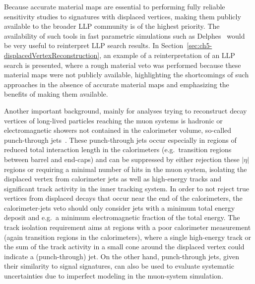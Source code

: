 Because accurate material maps are essential to performing fully reliable sensitivity studies to signatures with displaced vertices, making them publicly available to the broader LLP community is of the highest priority. The availability of such tools in fast parametric simulations such as Delphes~\cite{deFavereau:2013fsa} would be very useful to reinterpret LLP search results. In Section~\ref{sec:ch5-displacedVertexReconstruction}, an example of a reinterpretation of an LLP search is presented, where a rough material veto was performed because these material maps were not publicly available, highlighting the shortcomings of such approaches in the absence of accurate material maps and emphasizing the benefits of making them available.


Another important background, mainly for analyses trying to reconstruct decay vertices of long-lived particles reaching the muon systems is hadronic or electromagnetic showers not contained in the calorimeter volume, so-called punch-through jets~\cite{}. These punch-through jets occur especially in regions of reduced total interaction length in the calorimeters (e.g.\ transition regions between barrel and end-caps) and can be suppressed by either rejection these $|\eta|$ regions or requiring a minimal number of hits in the muon system, isolating the displaced vertex from calorimeter jets as well as high-energy tracks and significant track activity in the inner tracking system. In order to not reject true vertices from displaced decays that occur near the end of the calorimeters, the calorimeter-jets veto should only consider jets with a minimum total energy deposit and e.g.\ a minimum electromagnetic fraction of the total energy. The track isolation requirement aims at regions with a poor calorimeter measurement (again transition regions in the calorimeters), where a single high-energy track or the sum of the track activity in a small cone around the displaced vertex could indicate a (punch-through) jet.
On the other hand, punch-through jets, given their similarity to signal signatures, can also be used to evaluate systematic uncertainties due to imperfect modeling in the muon-system simulation.

